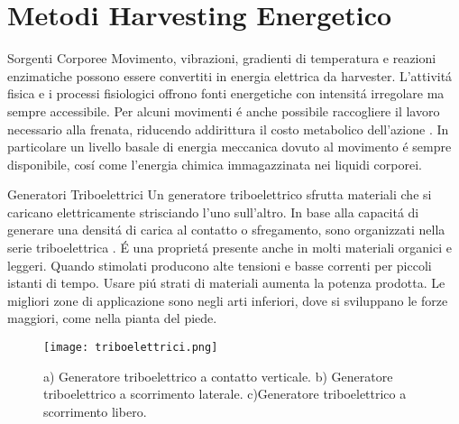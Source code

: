 \chapter{Metodi Harvesting Energetico}

\begin{section}{Sorgenti Corporee}
   Movimento, vibrazioni, gradienti di temperatura e reazioni enzimatiche possono essere convertiti in energia elettrica da harvester. L'attivit\'a fisica e i processi fisiologici offrono fonti energetiche con intensit\'a irregolare ma sempre accessibile. Per alcuni movimenti \'e anche possibile raccogliere il lavoro necessario alla frenata, riducendo addirittura il costo metabolico dell'azione \cite{liuBiomechanicalEnergyHarvesting2022}. In particolare un livello basale di energia meccanica dovuto al movimento \'e sempre disponibile, cos\'i come l'energia chimica immagazzinata nei liquidi corporei.
   
   \begin{subsection}{Generatori Triboelettrici}
    Un generatore triboelettrico sfrutta materiali che si caricano elettricamente strisciando l'uno sull'altro. In base alla capacit\'a di generare una densit\'a di carica al contatto o sfregamento, sono organizzati nella serie triboelettrica \cite{zouQuantifyingTriboelectricSeries2019}. \'E una propriet\'a presente anche in molti materiali organici e leggeri. Quando stimolati producono alte tensioni e basse correnti per piccoli istanti di tempo. Usare pi\'u strati di materiali aumenta la potenza prodotta. Le migliori zone di applicazione sono negli arti inferiori, dove si sviluppano le forze maggiori, come nella pianta del piede.
    \begin{figure}[H]
        \texttt{[image: triboelettrici.png]}
        \centering
        \caption{a) Generatore triboelettrico a contatto verticale. b) Generatore triboelettrico a scorrimento laterale. c)Generatore triboelettrico a scorrimento libero.}
        \label{fig:triboelettrici}
    \end{figure}
   \end{subsection}


\end{section}
